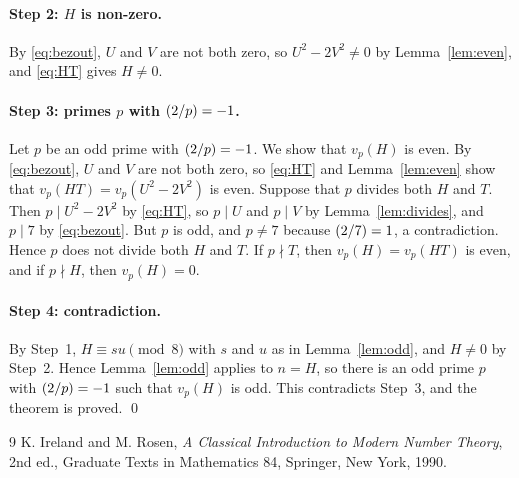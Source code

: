 \documentclass[11pt]{article}
\newcommand{\leg}[2]{\mathchoice{\biggl(\dfrac{#1}{#2}\biggr)}{(#1/#2)}{(#1/#2)}{(#1/#2)}}
\begin{document}
\paragraph{Step 2: $H$ is non-zero.} By \eqref{eq:bezout}, $U$ and $V$ are not both zero, so $U^2-2V^2\neq0$ by Lemma~\ref{lem:even}, and \eqref{eq:HT} gives $H\neq0$.

\paragraph{\texorpdfstring{Step 3: primes $p$ with $\leg{2}{p}=-1$.}{Step 3: inert primes.}} Let $p$ be an odd prime with $\leg{2}{p}=-1$. We show that $v_p(H)$ is even. By \eqref{eq:bezout}, $U$ and $V$ are not both zero, so \eqref{eq:HT} and Lemma~\ref{lem:even} show that $v_p(HT)=v_p(U^2-2V^2)$ is even. Suppose that $p$ divides both $H$ and $T$. Then $p\mid U^2-2V^2$ by \eqref{eq:HT}, so $p\mid U$ and $p\mid V$ by Lemma~\ref{lem:divides}, and $p\mid 7$ by \eqref{eq:bezout}. But $p$ is odd, and $p\neq7$ because $\leg{2}{7}=1$, a contradiction. Hence $p$ does not divide both $H$ and $T$. If $p\nmid T$, then $v_p(H)=v_p(HT)$ is even, and if $p\nmid H$, then $v_p(H)=0$.

\paragraph{Step 4: contradiction.} By Step~1, $H\equiv su\pmod{8}$ with $s$ and $u$ as in Lemma~\ref{lem:odd}, and $H\neq0$ by Step~2. Hence Lemma~\ref{lem:odd} applies to $n=H$, so there is an odd prime $p$ with $\leg{2}{p}=-1$ such that $v_p(H)$ is odd. This contradicts Step~3, and the theorem is proved.
\qed

\begin{thebibliography}{9}
 K. Ireland and M. Rosen, \emph{A Classical Introduction to Modern Number Theory}, 2nd ed., Graduate Texts in Mathematics 84, Springer, New York, 1990.
\end{thebibliography}
\end{document}
